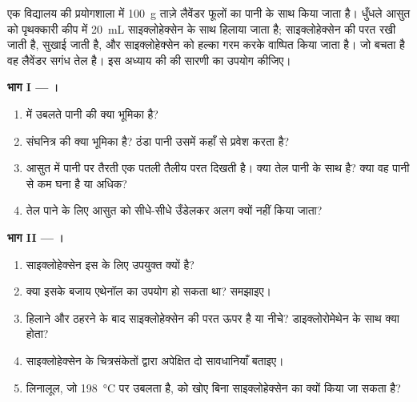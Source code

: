 \begin{problem}[{सप्ताहांत समस्या --- लैवेंडर के फूलों की एक टोकरी से सगंध तेल की
कुछ बूँदों तक, वर्णलेखन से जाँची गई}]
\label{pb:g10:chemical-species:1}
एक विद्यालय की प्रयोगशाला में \qty{100}{g} ताज़े लैवेंडर फूलों का पानी के साथ
 किया जाता है। धुँधले आसुत को पृथक्कारी कीप में
\qty{20}{mL} साइक्लोहेक्सेन के साथ हिलाया जाता है; साइक्लोहेक्सेन की परत
रखी जाती है, सुखाई जाती है, और साइक्लोहेक्सेन को हल्का गरम करके वाष्पित किया
जाता है। जो बचता है वह लैवेंडर सगंध तेल है। इस अध्याय की  की
सारणी का उपयोग कीजिए।

\medskip
\noindent\textbf{भाग I --- ।}
\begin{enumerate}
  \item {} में उबलते पानी की क्या भूमिका है?
  \item संघनित्र की क्या भूमिका है? ठंडा पानी उसमें कहाँ से प्रवेश
        करता है?
  \item आसुत में पानी पर तैरती एक पतली तैलीय परत दिखती है। क्या तेल पानी
        के साथ  है? क्या वह पानी से कम घना है या अधिक?
  \item तेल पाने के लिए आसुत को सीधे-सीधे उँडेलकर अलग क्यों नहीं किया जाता?
\end{enumerate}

\medskip
\noindent\textbf{भाग II --- ।}
\begin{enumerate}[resume]
  \item साइक्लोहेक्सेन इस  के लिए उपयुक्त  क्यों है?
  \item क्या इसके बजाय एथेनॉल का उपयोग हो सकता था? समझाइए।
  \item हिलाने और ठहरने के बाद साइक्लोहेक्सेन की परत ऊपर है या
        नीचे? डाइक्लोरोमेथेन के साथ क्या होता?
  \item साइक्लोहेक्सेन के चित्रसंकेतों द्वारा अपेक्षित दो सावधानियाँ बताइए।
  \item लिनालूल, जो \qty{198}{\celsius} पर उबलता है, को खोए बिना
        साइक्लोहेक्सेन का  क्यों किया जा सकता है?
\end{enumerate}


\end{problem}
